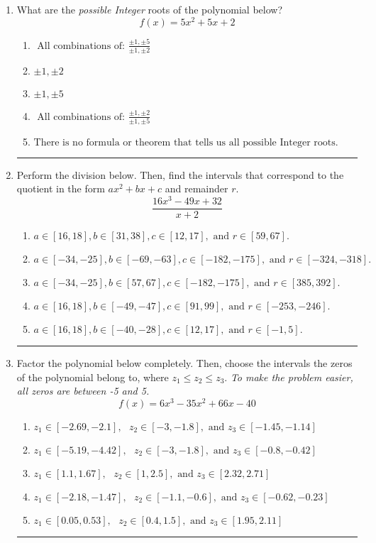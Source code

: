 \documentclass[14pt]{extbook}
\newcommand{\litem}[1]{\item#1\hspace*{-1cm}\rule{\textwidth}{0.4pt}}
\begin{document}
\begin{enumerate}
{\begin{enumerate}[label=\Alph*.]
\end{enumerate} }
\litem{
What are the \textit{possible Integer} roots of the polynomial below?\[ f(x) = 5x^{2} +5 x + 2 \]\begin{enumerate}[label=\Alph*.]
\item \( \text{ All combinations of: }\frac{\pm 1,\pm 5}{\pm 1,\pm 2} \)
\item \( \pm 1,\pm 2 \)
\item \( \pm 1,\pm 5 \)
\item \( \text{ All combinations of: }\frac{\pm 1,\pm 2}{\pm 1,\pm 5} \)
\item \( \text{There is no formula or theorem that tells us all possible Integer roots.} \)

\end{enumerate} }
\litem{
Perform the division below. Then, find the intervals that correspond to the quotient in the form $ax^2+bx+c$ and remainder $r$.\[ \frac{16x^{3} -49 x + 32}{x + 2} \]\begin{enumerate}[label=\Alph*.]
\item \( a \in [16, 18], b \in [31, 38], c \in [12, 17], \text{ and } r \in [59, 67]. \)
\item \( a \in [-34, -25], b \in [-69, -63], c \in [-182, -175], \text{ and } r \in [-324, -318]. \)
\item \( a \in [-34, -25], b \in [57, 67], c \in [-182, -175], \text{ and } r \in [385, 392]. \)
\item \( a \in [16, 18], b \in [-49, -47], c \in [91, 99], \text{ and } r \in [-253, -246]. \)
\item \( a \in [16, 18], b \in [-40, -28], c \in [12, 17], \text{ and } r \in [-1, 5]. \)

\end{enumerate} }
\litem{
Factor the polynomial below completely. Then, choose the intervals the zeros of the polynomial belong to, where $z_1 \leq z_2 \leq z_3$. \textit{To make the problem easier, all zeros are between -5 and 5.}\[ f(x) = 6x^{3} -35 x^{2} +66 x -40 \]\begin{enumerate}[label=\Alph*.]
\item \( z_1 \in [-2.69, -2.1], \text{   }  z_2 \in [-3, -1.8], \text{   and   } z_3 \in [-1.45, -1.14] \)
\item \( z_1 \in [-5.19, -4.42], \text{   }  z_2 \in [-3, -1.8], \text{   and   } z_3 \in [-0.8, -0.42] \)
\item \( z_1 \in [1.1, 1.67], \text{   }  z_2 \in [1, 2.5], \text{   and   } z_3 \in [2.32, 2.71] \)
\item \( z_1 \in [-2.18, -1.47], \text{   }  z_2 \in [-1.1, -0.6], \text{   and   } z_3 \in [-0.62, -0.23] \)
\item \( z_1 \in [0.05, 0.53], \text{   }  z_2 \in [0.4, 1.5], \text{   and   } z_3 \in [1.95, 2.11] \)


\end{enumerate}}
\end{enumerate}
\end{document}

